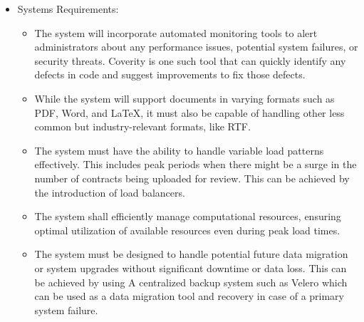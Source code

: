 \begin{itemize}
\begin{itemize}
    \end{itemize}
    \item Systems Requirements: 
    \begin{itemize}
        \item The system will incorporate automated monitoring tools to alert administrators about any performance issues, potential system failures, or security threats. Coverity\cite{coverity} is one such tool that can quickly identify any defects in code and suggest improvements to fix those defects. 
        \item While the system will support documents in varying formats such as PDF, Word, and LaTeX, it must also be capable of handling other less common but industry-relevant formats, like RTF.
        \item The system must have the ability to handle variable load patterns effectively. This includes peak periods when there might be a surge in the number of contracts being uploaded for review. This can be achieved by the introduction of load balancers.
        \item The system shall efficiently manage computational resources, ensuring optimal utilization of available resources even during peak load times.
        \item The system must be designed to handle potential future data migration or system upgrades without significant downtime or data loss. This can be achieved by using A centralized backup system such as Velero\cite{velero} which can be used as a data migration tool and recovery in case of a primary system failure. 











\end{itemize}
\end{itemize}
